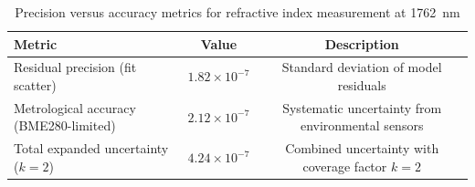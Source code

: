 \documentclass[aip,reprint,groupedaddress,onecolumn,superscriptaddress]{revtex4-2}
\begin{document}



\begin{table}[ht]
\centering
\caption{Precision versus accuracy metrics for refractive index measurement at \SI{1762}{\nano\meter}}
\begin{tabular}{lcc}
\toprule
\textbf{Metric} & \textbf{Value} & \textbf{Description} \\
\midrule
Residual precision (fit scatter) & $1.82 \times 10^{-7}$ & Standard deviation of model residuals \\
Metrological accuracy (BME280-limited) & $2.12 \times 10^{-7}$ & Systematic uncertainty from environmental sensors \\
Total expanded uncertainty ($k=2$) & $4.24 \times 10^{-7}$ & Combined uncertainty with coverage factor $k=2$ \\
\bottomrule
\end{tabular}
\end{table}

\end{document}
